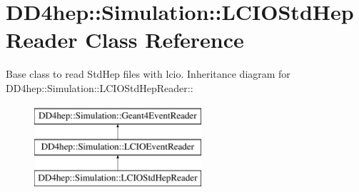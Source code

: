 \hypertarget{class_d_d4hep_1_1_simulation_1_1_l_c_i_o_std_hep_reader}{
\section{DD4hep::Simulation::LCIOStdHepReader Class Reference}
\label{class_d_d4hep_1_1_simulation_1_1_l_c_i_o_std_hep_reader}
}


Base class to read StdHep files with lcio.  
Inheritance diagram for DD4hep::Simulation::LCIOStdHepReader::\begin{figure}[H]
\begin{center}
\leavevmode
\includegraphics[height=3cm]{class_d_d4hep_1_1_simulation_1_1_l_c_i_o_std_hep_reader}
\end{center}
\end{figure}
